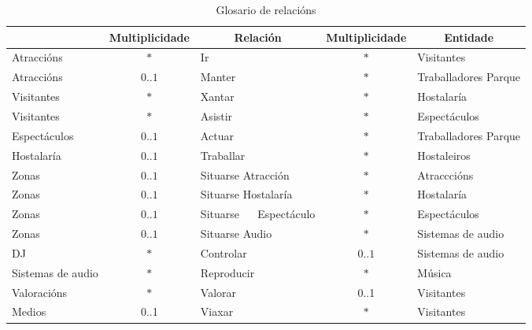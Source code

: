 \documentclass[12pt,a4paper]{book}
\theoremstyle{definition}
\theoremstyle{break}
\begin{document}
	\newpage
	
	\begin{table} [H] \centering
		\caption{Glosario de relacións}
		\begin{tabular}{|m{2.3cm}|c|m{2.05cm}|c|m{2.4cm}|}
			\hline \rowcolor{gris}
			\multicolumn{1}{|c|}{Entidade} & \multicolumn{1}{c|}{Multiplicidade} & \multicolumn{1}{c|}{Relación} & \multicolumn{1}{c|}{Multiplicidade} & \multicolumn{1}{c|}{Entidade} \\
			\hline
			Atraccións & $*$ & Ir & $*$ & Visitantes \\
			\hline
			Atraccións & $0$..$1$ & Manter & $*$ & Traballadores Parque \\
			\hline
			Visitantes & $*$ & Xantar & $*$ & Hostalaría \\
			\hline
			Visitantes & $*$ & Asistir & $*$ & Espectáculos \\
			\hline
			Espectáculos & $0$..$1$ & Actuar & $*$ & Traballadores Parque \\
			\hline
			Hostalaría & $0$..$1$ & Traballar & $*$ & Hostaleiros \\
			\hline
			Zonas & $0$..$1$ & Situarse Atracción & $*$ & Atracccións\\
			\hline
			Zonas & $0$..$1$ & Situarse Hostalaría & $*$ & Hostalaría\\
			\hline
			Zonas & $0$..$1$ & Situarse \textcolor{white}{aa} Espectáculo & $*$ & Espectáculos\\
			\hline
			Zonas & $0$..$1$ & Situarse Audio & $*$ & Sistemas de audio\\
			\hline
			DJ & $*$ & Controlar & $0$..$1$ & Sistemas de audio\\
			\hline
			Sistemas de audio & $*$ & Reproducir & $*$ & Música\\
			\hline
			Valoracións & $*$ & Valorar & 0..1 & Visitantes\\
			\hline
			Medios & 0..1 & Viaxar & $*$& Visitantes\\
			\hline
		\end{tabular}
	\end{table}
	
	
	\newpage
	
\end{document}
